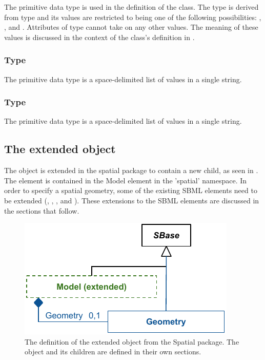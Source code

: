 The  primitive data type is used in the definition of the \CSGSetOperator class.  The type  is derived from type  and its values are restricted to being one of the following possibilities: , , and .  Attributes of type  cannot take on any other values.  The meaning of these values is discussed in the context of the \CSGSetOperator class's definition in .


\subsubsection{Type \fixttspace{}}
\label{primtype-doublearray}

The  primitive data type is a space-delimited list of  values in a single string.  


\subsubsection{Type \fixttspace{}}
\label{primtype-integerarray}

The  primitive data type is a space-delimited list of  values in a single string.  

\clearpage


\subsection{The extended \Model object}
\label{extended-model-class}
The \Model object is extended in the spatial package to contain a new \Geometry child, as seen in
. The \Geometry element is contained in the Model element in the 'spatial' namespace. In order to specify a spatial geometry, some of the existing SBML elements need to be extended (\Compartment, \Species, \Parameter, and \Reaction). These extensions to the SBML elements are discussed in the sections that follow.
 
\begin{figure}[ht]
  \includegraphics{figs/extended-model-uml}
  \caption{The definition of the extended \Model object from the Spatial package.  The \Geometry object and its children are defined in their own sections.}
  \label{model-uml}
\end{figure}




